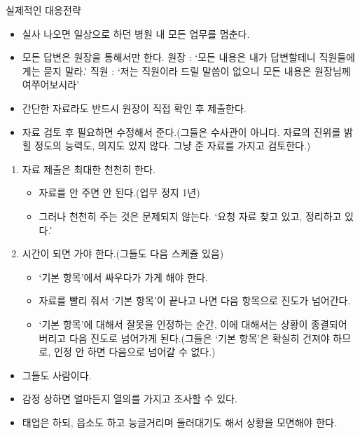 \Large{실제적인 대응전략}\normalsize
\par
\medskip 
{}
\begin{itemize}\tightlist
\item 실사 나오면 일상으로 하던 병원 내 모든 업무를 멈춘다.
\item 모든 답변은 원장을 통해서만 한다.\newline
 원장 : ‘모든 내용은 내가 답변할테니 직원들에게는 묻지 말라.’ \newline
 직원 :  ‘저는 직원이라 드릴 말씀이 없으니 모든 내용은 원장님께 여쭈어보시라’
\item 간단한 자료라도 반드시 원장이 직접 확인 후 제출한다.
\item 자료 검토 후 필요하면 수정해서 준다.(그들은 수사관이 아니다. 자료의 진위를 밝힐 정도의 능력도, 의지도 있지 않다. 그냥 준 자료를 가지고 검토한다.)
\end{itemize}

\begin{enumerate}[①]\tightlist
\item 자료 제출은 최대한 천천히 한다. 
	\begin{itemize}\tightlist
	\item 자료를 안 주면 안 된다.(업무 정지 1년)
	\item 그러나 천천히 주는 것은 문제되지 않는다.  ‘요청 자료 찾고 있고, 정리하고 있다.’
	\end{itemize}
\item 시간이 되면 가야 한다.(그들도 다음 스케쥴 있음)
	\begin{itemize}\tightlist
	\item ‘기본 항목’에서 싸우다가 가게 해야 한다.
	\item 자료를 빨리 줘서 ‘기본 항목’이 끝나고 나면 다음 항목으로 진도가 넘어간다.
	\item ‘기본 항목’에 대해서 잘못을 인정하는 순간, 이에 대해서는 상황이 종결되어 버리고 다음 진도로 넘어가게 된다.(그들은 ‘기본 항목’은 확실히 건져야 하므로, 인정 안 하면 다음으로 넘어갈 수 없다.)
	\end{itemize}
\end{enumerate} 
\begin{itemize}\tightlist
\item 그들도 사람이다.
\item 감정 상하면 얼마든지 열의를 가지고 조사할 수 있다.
\item 태업은 하되, 읍소도 하고 능글거리며 둘러대기도 해서 상황을 모면해야 한다. 
\end{itemize}

